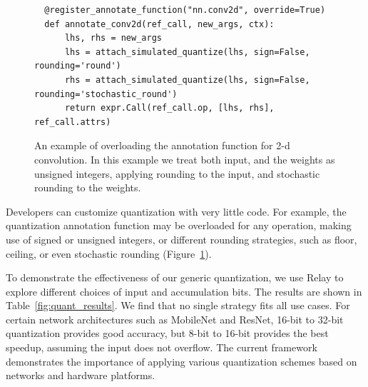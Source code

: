 
\begin{figure}[t]
  \begin{verbatim}
  @register_annotate_function("nn.conv2d", override=True)
  def annotate_conv2d(ref_call, new_args, ctx):
      lhs, rhs = new_args
      lhs = attach_simulated_quantize(lhs, sign=False, rounding='round')
      rhs = attach_simulated_quantize(lhs, sign=False, rounding='stochastic_round')
      return expr.Call(ref_call.op, [lhs, rhs], ref_call.attrs)
  \end{verbatim}
  \caption{
    An example of overloading the annotation function for 2-d convolution.
    In this example we treat both input, and the weights as unsigned integers,
    applying rounding to the input, and stochastic rounding to the weights.}
  \label{fig:annotate_conv}
\end{figure}

Developers can customize quantization with very little code.
For example, the quantization annotation function may be overloaded for any operation,
  making use of signed or unsigned integers, or different rounding strategies, such as
  floor, ceiling, or even stochastic rounding (Figure~\ref{fig:annotate_conv}).


To demonstrate the effectiveness of our generic quantization,
  we use Relay to explore
  different choices of input and accumulation bits.
The results are shown in Table~\ref{fig:quant_results}.
We find that no single strategy fits all use cases.
For certain network architectures such as MobileNet and ResNet, 16-bit to 32-bit
  quantization provides good accuracy,
   but 8-bit to 16-bit provides the best speedup,
  assuming the input does not overflow.
The current framework demonstrates the importance of applying
  various quantization schemes based on networks and hardware platforms.

